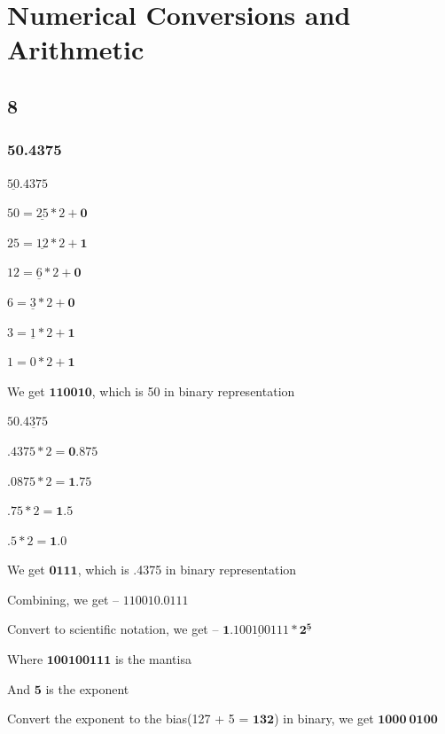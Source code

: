 \documentclass{article}
\begin{document}
    \newpage

    \section*{Numerical Conversions and Arithmetic}

    \subsection*{8}

    \subsubsection*{50.4375}

    $\underline{50}.4375$

    $50 = \underline{25} * 2 + \mathbf{0}$

    $25 = \underline{12} * 2 + \mathbf{1}$

    $12 = \underline{6} * 2 + \mathbf{0}$

    $6 = \underline{3} * 2 + \mathbf{0}$

    $3 = \underline{1} * 2 + \mathbf{1}$

    $1 = 0 * 2 + \mathbf{1}$

    We get $\mathbf{110010}$, which is 50 in binary representation

    \vspace*{0.1in}

    $50\underline{.4375}$

    $.4375 * 2 = \mathbf{0}.875$

    $.0875 * 2 = \mathbf{1}.75$

    $.75 * 2 = \mathbf{1}.5$

    $.5 * 2 = \mathbf{1}.0$

    We get $\mathbf{0111}$, which is .4375 in binary representation

    \vspace*{0.1in}

    Combining, we get -- $\mathbf{110010.0111}$

    Convert to scientific notation, we get -- $\mathbf{1\underline{.100100111} * 2^{\underline{5}}}$

    Where $\mathbf{100100111}$ is the mantisa

    And $\mathbf{5}$ is the exponent

    Convert the exponent to the bias(127 + 5 = $\mathbf{132}$) in binary, we get $\mathbf{1000\: 0100}$
\end{document}

